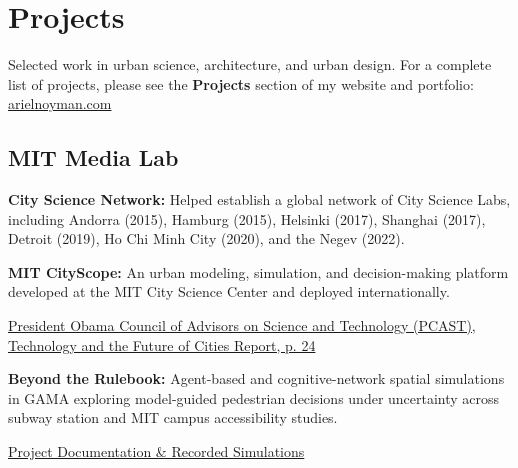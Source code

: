 \section*{Projects}
Selected work in urban science, architecture, and urban design. For a complete list of projects, please see the \textbf{Projects} section of my website and portfolio: \href{https://arielnoyman.com/}{arielnoyman.com}

\subsection*{MIT Media Lab}

\begin{tablist}

    \item[2015--present] \tab \textbf{City Science Network:} {Helped establish a global network of City Science Labs, including Andorra (2015), Hamburg (2015), Helsinki (2017), Shanghai (2017), Detroit (2019), Ho Chi Minh City (2020), and the Negev (2022).}
    \begin{tablist}
        \item[2022--present] 
        \item[2015--present] 
    \end{tablist}

    \item[2014--present] \tab \textbf{MIT CityScope:} {An urban modeling, simulation, and decision-making platform developed at the MIT City Science Center and deployed internationally.}
    \begin{tablist}
        \item[2016] \tab \href{https://obamawhitehouse.archives.gov/blog/2016/02/23/pcast-releases-technology-and-future-cities-report-president}{President Obama Council of Advisors on Science and Technology (PCAST), Technology and the Future of Cities Report, p. 24}
    \end{tablist}

    \item[2026] \tab \textbf{Beyond the Rulebook:} {Agent-based and cognitive-network spatial simulations in GAMA exploring model-guided pedestrian decisions under uncertainty across subway station and MIT campus accessibility studies.}
    \begin{tablist}
        \item[2026] \tab \href{https://arielnoyman.com/work/beyond-the-rulebook.html}{Project Documentation \& Recorded Simulations}
    \end{tablist}


\end{tablist}
